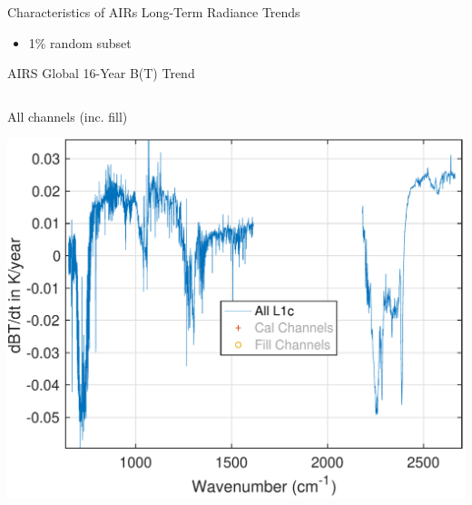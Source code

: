 \documentclass[10pt,t]{beamer}
\begin{document}
\begin{frame}[label={sec:org35e37f9}]{Characteristics of AIRs Long-Term Radiance Trends}
\begin{itemize}
\item 1\% random subset
\end{itemize}
\end{frame}
\begin{frame}[label={sec:org4503062}]{AIRS Global 16-Year B(T) Trend}
\vspace{-0.35in}

\begin{columns}
\begin{column}{0.55\columnwidth}
\begin{block}{\footnotesize All channels (inc. fill)}
\vspace{-0.1in}
\begin{center}
\includegraphics[width=0.85\linewidth]{./Figs/Pdf/rand_global_trend_l1c_overview.pdf}
\end{center}
\end{block}
\end{column}



\end{columns}
\end{frame}
\end{document}
